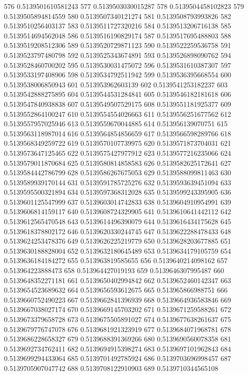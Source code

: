 576 0.5139501610581243
577 0.5139503030015287
578 0.5139504458102823
579 0.5139505894814559
580 0.5139507340121274
581 0.5139508793993826
582 0.5139510256403137
583 0.5139511727320216
584 0.5139513206716138
585 0.5139514694562048
586 0.5139516190829174
587 0.5139517695488803
588 0.5139519208512306
589 0.5139520729871123
590 0.5139522259536758
591 0.5139523797480798
592 0.5139525343674891
593 0.5139526898090762
594 0.5139528460700202
595 0.5139530031475072
596 0.5139531610387307
597 0.5139533197408906
598 0.5139534792511942
599 0.5139536395668554
600 0.5139538006850943
601 0.513953962603139
602 0.5139541253182237
603 0.5139542888275895
604 0.5139544531284841
605 0.5139546182181618
606 0.5139547840938838
607 0.5139549507529175
608 0.5139551181925377
609 0.5139552864100247
610 0.5139554554026663
611 0.5139556251677562
612 0.5139557957025946
613 0.5139559670044885
614 0.513956139070751
615 0.5139563118987014
616 0.5139564854856659
617 0.5139566598289766
618 0.5139568349259722
619 0.5139570107739975
620 0.5139571873704031
621 0.5139573647125465
622 0.5139575427977912
623 0.5139577216235066
624 0.5139579011870684
625 0.5139580814858583
626 0.5139582625172641
627 0.5139584442786799
628 0.5139586267675053
629 0.5139588099811463
630 0.5139589939170144
631 0.5139591785725276
632 0.5139593639451094
633 0.5139595500321894
634 0.5139597368312028
635 0.5139599243395905
636 0.5139601125547999
637 0.5139603014742833
638 0.5139604910954991
639 0.5139606814159117
640 0.5139608724329905
641 0.5139610641442112
642 0.5139612565470548
643 0.5139614496390079
644 0.5139616434175628
645 0.5139618378802172
646 0.5139620330244745
647 0.5139622288478433
648 0.5139624253478376
649 0.5139626225219779
650 0.5139628203677885
651 0.5139630188828004
652 0.5139632180645489
653 0.5139634179105759
654 0.5139636184184272
655 0.513963819585655
656 0.5139640214098162
657 0.513964223888473
658 0.513964427019193
659 0.5139646307995487
660 0.5139648352271181
661 0.5139650402994842
662 0.5139652460142347
663 0.5139654523689632
664 0.5139656593612675
665 0.513965866988751
666 0.5139660752490223
667 0.5139662841396939
668 0.5139664936583846
669 0.5139667038027174
670 0.5139669145703202
671 0.5139671259588261
672 0.5139673379658728
673 0.5139675505891027
674 0.5139677638261637
675 0.5139679776747078
676 0.5139681921323919
677 0.5139684071968781
678 0.5139686228658327
679 0.5139688391369266
680 0.5139690560078358
681 0.5139692734762411
682 0.5139694915398274
683 0.5139697101962843
684 0.5139699294433064
685 0.5139701492785924
686 0.5139703696998457
687 0.5139705907047742
688 0.5139708122910903
689 0.5139710344565108
